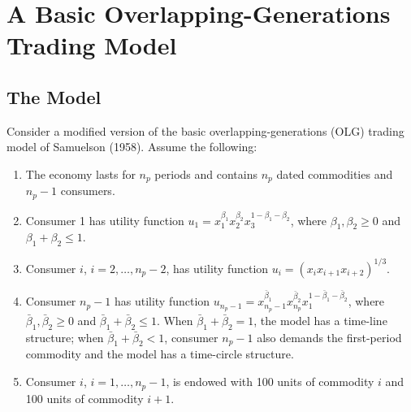 \documentclass[
  letterpaper,
  DIV=11,
  numbers=noendperiod]{scrreprt}
\newenvironment{Shaded}{\begin{snugshade}}{\end{snugshade}}
\newcommand{\FloatTok}[1]{\textcolor[rgb]{0.68,0.00,0.00}{#1}}
\newcommand{\FunctionTok}[1]{\textcolor[rgb]{0.28,0.35,0.67}{#1}}
\newcommand{\NormalTok}[1]{\textcolor[rgb]{0.00,0.23,0.31}{#1}}
\newcommand{\OperatorTok}[1]{\textcolor[rgb]{0.37,0.37,0.37}{#1}}
\newcommand{\StringTok}[1]{\textcolor[rgb]{0.13,0.47,0.30}{#1}}
\begin{document}
%

\section{A Basic Overlapping-Generations Trading
Model}\label{a-basic-overlapping-generations-trading-model}

\subsection{The Model}\label{the-model}

Consider a modified version of the basic overlapping-generations (OLG)
trading model of Samuelson (1958). Assume the following:

\begin{enumerate}
\def\labelenumi{\arabic{enumi}.}
\item
  The economy lasts for \(n_p\) periods and contains \(n_p\) dated
  commodities and \(n_p-1\) consumers.
\item
  Consumer 1 has utility function
  \(u_1=x_1^{\beta_1}x_2^{\beta_2}x_3^{1-\beta_1-\beta_2}\), where
  \(\beta_1,\beta_2\geq0\) and \(\beta_1+\beta_2\leq1\).
\item
  Consumer \(i\), \(i=2,\ldots,n_p-2\), has utility function
  \(u_i=(x_i x_{i+1}x_{i+2})^{1/3}\).
\item
  Consumer \(n_p-1\) has utility function
  \(u_{n_p-1}=x_{n_p-1}^{\bar\beta_1}x_{n_p}^{\bar\beta_2}x_1^{1-\bar\beta_1-\bar\beta_2}\),
  where \(\bar\beta_1,\bar\beta_2\geq0\) and
  \(\bar\beta_1+\bar\beta_2\leq1\). When \(\bar\beta_1+\bar\beta_2=1\),
  the model has a time-line structure; when
  \(\bar\beta_1+\bar\beta_2<1\), consumer \(n_p-1\) also demands the
  first-period commodity and the model has a time-circle structure.
\item
  Consumer \(i\), \(i=1,\ldots,n_p-1\), is endowed with 100 units of
  commodity \(i\) and 100 units of commodity \(i+1\).
\end{enumerate}
\end{document}
